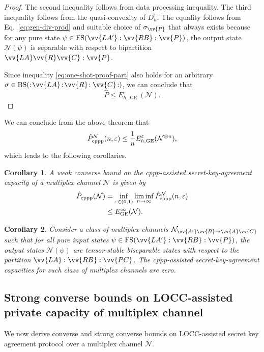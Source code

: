 \documentclass[aps,pra,twocolumn,superscriptaddress,longbibliography]{revtex4-1}
\def\FS{\operatorname{FS}}
\def\GE{\operatorname{GE}}
\def\BS{\operatorname{BS}}
\newcommand{\mc}[1]{\mathcal{#1}}
\newtheorem{corollary}{Corollary}
\begin{document}
\begin{proof}
The second inequality follows from data processing inequality. The third inequality follows from the quasi-convexity of $D^\varepsilon_h$. The equality follows from Eq.~\eqref{eq:gen-div-prod} and suitable choice of $\sigma_{\vv{P}}$ that always exists because for any pure state $\psi\in\FS(\vv{LA'}:\vv{RB}:\vv{P})$, the output state $\mc{N}(\psi)$ is separable with respect to bipartition $\vv{LA}\vv{R}\vv{C}:\vv{P}$. 

Since inequality \eqref{eq:one-shot-proof-part} also holds for an arbitrary $\sigma\in\BS(:\!\vv{LA}\!:\!\vv{R}\!:\vv{C}\!:)$, we can conclude that
\begin{equation}
\hat{P}\leq E^\varepsilon_{h,\GE}(\mc{N}).
\end{equation} 
\end{proof}
\fi 
We can conclude from the above theorem that 
\begin{equation}\label{eq:n-cppp}
\hat{P}^{\mc{N}}_{\textnormal{cppp}}(n,\varepsilon) \leq \frac{1}{n}E^\varepsilon_{h,\GE}(\mc{N}^{\otimes n}),
\end{equation}
which leads to the following corollaries. 


\begin{corollary}
A weak converse bound on the cppp-assisted secret-key-agreement capacity of a multiplex channel $\mc{N}$ is given by
\begin{align}
    \hat{P}_{\textnormal{cppp}}(\mc{N})& = \inf_{\varepsilon\in (0,1)}\liminf_{n\to\infty}\hat{P}^{\mc{N}}_{\textnormal{cppp}}(n,\varepsilon)\\ 
    &\leq E^{\infty}_{\GE}(\mc{N}).
\end{align}
\end{corollary}

\begin{corollary}
    Consider a class of multiplex channels $\mc{N}_{\vv{A'}\vv{B}\to\vv{A}\vv{C}}$ such that for all pure input states $\psi\in\FS(\vv{LA'}:\vv{RB}:\vv{P})$, the output states $\mc{N}(\psi)$ are tensor-stable biseparable states with respect to the partition $\vv{LA}:\vv{RB}:\vv{PC}$. The cppp-assisted secret-key-agreement capacities for such class of multiplex channels are zero. 
\end{corollary}

\subsection{Strong converse bounds on LOCC-assisted private capacity of multiplex channel} 
We now derive converse and strong converse bounds on LOCC-assisted secret key agreement protocol over a multiplex channel $\mc{N}$.
\end{document}

